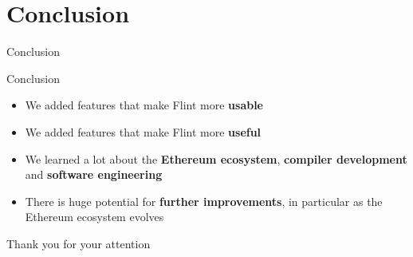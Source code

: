\documentclass[aspectratio=169]{beamer}
\newcommand{\sectionslide}[1]{%
  \section{#1}
  \begin{frame}
  \begin{center}
    \vbox{}
    {\LARGE \usebeamercolor[fg]{title} #1}
    \par
  \end{center}
  \end{frame}
}
\begin{document}
\sectionslide{Conclusion}
%
%
\begin{frame}{Conclusion}
    \begin{center}
        \begin{itemize}
            \item We added features that make Flint more \textbf{usable}
            \item We added features that make Flint more \textbf{useful}
            \item We learned a lot about the \textbf{Ethereum ecosystem}, \textbf{compiler development} and \textbf{software engineering}
            \item There is huge potential for \textbf{further improvements}, in particular as the Ethereum ecosystem evolves
        \end{itemize}
    \end{center}
\end{frame}

\begin{frame}
 	\vbox{}
	\begin{center}
	\LARGE{} Thank you for your attention
	\end{center}
\end{frame}
\end{document}
